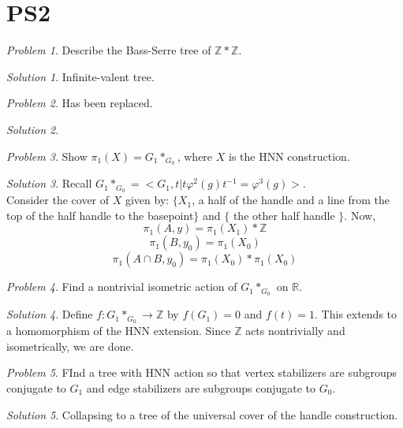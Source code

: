 \documentclass[11pt]{article}
\theoremstyle{definition}
\theoremstyle{example}
\theoremstyle{remark}
\theoremstyle{lemma}
\theoremstyle{proposition}
\theoremstyle{Problem}
\newtheorem{problem}{Problem}[section]
\theoremstyle{Solution}
\newtheorem{solution}{Solution}[section]
\theoremstyle{theorem}
\theoremstyle{corollary}
\begin{document}
\newpage
\section{PS2}
\begin{problem}
Describe the Bass-Serre tree of $\mathbb{Z}*\mathbb{Z}$.
\end{problem}
\begin{solution}
Infinite-valent tree.\\
\end{solution}

\begin{problem}
Has been replaced.
\end{problem}
\begin{solution}
\end{solution}


\begin{problem}
Show $\pi_1(X) = G_1\ast_{G_0}$, where $X$ is the HNN construction.
\end{problem}
\begin{solution}
Recall $G_1\ast_{G_0} = <G_1, t | t\varphi^2(g)t^{-1} = \varphi^3(g)>$.\\
Consider the cover of $X$ given by: $\{X_1$, a half of the handle and a line from the top of the half handle to the basepoint$\}$ and $\{$ the other half handle $\}$. Now,
$$\pi_1(A,y) = \pi_1(X_1)*\mathbb{Z}$$
$$\pi_1(B,y_0) = \pi_1(X_0)$$
$$\pi_1(A\cap B,y_0) = \pi_1(X_0) * \pi_1(X_0)$$
\end{solution}

\begin{problem}
Find a nontrivial isometric action of $G_1\ast_{G_0}$ on $\mathbb{R}$.
\end{problem}
\begin{solution}
Define $f:G_1\ast_{G_0}\to \mathbb{Z}$ by $f(G_1)=0$ and $f(t)=1$. This extends to a homomorphism of the HNN extension. Since $\mathbb{Z}$ acts nontrivially and isometrically, we are done.\\
\end{solution}

\begin{problem}
FInd a tree with HNN action so that vertex stabilizers are subgroups conjugate to $G_1$ and edge stabilizers are subgroups conjugate to $G_0$.
\end{problem}
\begin{solution}
Collapsing to a tree of the universal cover of the handle construction.
\end{solution}
\end{document}
